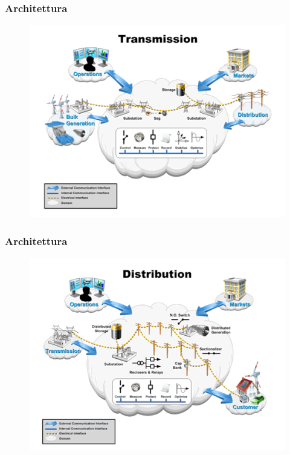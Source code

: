 \begin{frame}[fragile]
  \frametitle{Architettura}
	\begin{figure}[h] 
		\includegraphics[scale=0.6]{imgs/tras.png}
	\end{figure}
\end{frame}

\begin{frame}[fragile]
  \frametitle{Architettura}
	\begin{figure}[h] 
		\includegraphics[scale=0.6]{imgs/distr.png}
	\end{figure}
\end{frame}

